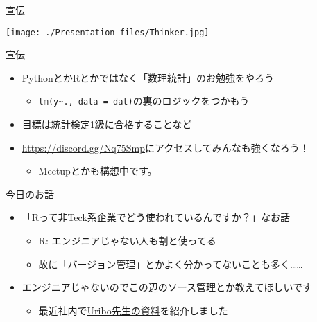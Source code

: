 \documentclass[ignorenonframetext,]{beamer}
\providecommand{\tightlist}{%
  \setlength{\itemsep}{0pt}\setlength{\parskip}{0pt}}
\begin{document}
\begin{frame}{宣伝}
\protect\hypertarget{-1}{}

\texttt{[image: ./Presentation\_files/Thinker.jpg]}

\end{frame}

\begin{frame}[fragile]{宣伝}
\protect\hypertarget{-2}{}

\begin{itemize}
\tightlist
\item
  PythonとかRとかではなく「数理統計」のお勉強をやろう

  \begin{itemize}
  \tightlist
  \item
    \texttt{lm(y\textasciitilde{}.,\ data\ =\ dat)}の裏のロジックをつかもう
  \end{itemize}
\item
  目標は統計検定1級に合格することなど
\item
  \url{https://discord.gg/Nq75Smp}にアクセスしてみんなも強くなろう！

  \begin{itemize}
  \tightlist
  \item
    Meetupとかも構想中です。
  \end{itemize}
\end{itemize}

\end{frame}

\begin{frame}{今日のお話}

\begin{itemize}
\tightlist
\item
  「Rって非Teck系企業でどう使われているんですか？」なお話

  \begin{itemize}
  \tightlist
  \item
    R: エンジニアじゃない人も割と使ってる
  \item
    故に「バージョン管理」とかよく分かってないことも多く\ldots{}\ldots{}
  \end{itemize}
\item
  エンジニアじゃないのでこの辺のソース管理とか教えてほしいです

  \begin{itemize}
  \tightlist
  \item
    最近社内で\href{https://speakerdeck.com/s_uryu/rstudio-for-team}{Uribo先生の資料}を紹介しました
  \end{itemize}
\end{itemize}

\end{frame}
\end{document}
